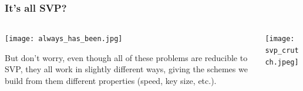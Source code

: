 \documentclass[
aspectratio=169, %
t, %
onlytextwidth, %
10pt, %
]{beamer}
\begin{document}
\begin{frame}
    \frametitle{It's all SVP?}

    \begin{columns}[T] %
        \begin{column}{0.58\linewidth} %
            \texttt{[image: always\_has\_been.jpg]} %

            \vspace{-1.5em}{\tiny\textcolor{ICLBlue}{(Above) Regev discovering the the LWE to $\gamma$-SVP reduction, 2005}}\newline

            \vspace{-2em}But don't worry, even though all of these problems are reducible to SVP, they all work in slightly different ways, giving the schemes we build from them different properties (speed, key size, etc.).
        \end{column}
        \begin{column}{0.38\linewidth} %
            \texttt{[image: svp\_crutch.jpeg]} %

            \vspace{-1.5em}{\tiny\textcolor{ICLBlue}{(Above) xkcd Dependency, lattice based cryptography special edition}}
        \end{column}
    \end{columns}
\end{frame}

\end{document}
